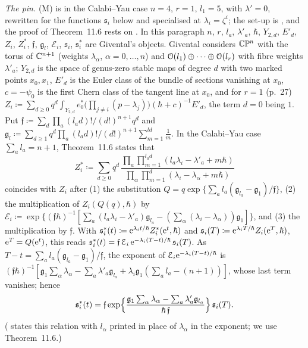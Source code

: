 \emph{The pin.} (M) is \cite[Theorem~11.6]{MR1408320} in the Calabi--Yau case $n=4$, $r=1$, $l_1=5$, with $\lambda'=0$, rewritten for the functions $\mathfrak s_i$ below and specialised at $\lambda_i=\zeta^i$; the set-up is \cite[Section~9, pp.~23--27]{MR1408320}, and the proof of Theorem~11.6 rests on \cite[Proposition~11.4]{MR1408320}. In this paragraph $n$, $r$, $l_a$, $\lambda'_a$, $\hbar$, $Y_{2,d}$, $E'_d$, $Z_i$, $Z_i^*$, $\mathfrak f$, $\mathfrak g_l$, $\mathcal E_i$, $\mathfrak s_i$, $\mathfrak s_i^*$ are Givental's objects. Givental considers $\mathbb{C}\mathbb{P}^n$ with the torus of $\mathbb{C}^{n+1}$ (weights $\lambda_\alpha$, $\alpha=0,\dots,n$) and $\mathcal{O}(l_1)\oplus\dots\oplus\mathcal{O}(l_r)$ with fibre weights $\lambda'_a$; $Y_{2,d}$ is the space of genus-zero stable maps of degree $d$ with two marked points $x_0,x_1$, $E'_d$ is the Euler class of the bundle of sections vanishing at $x_0$, $c=-\psi_0$ is the first Chern class of the tangent line at $x_0$, and for $r=1$ (p.~27) $Z_i\coloneqq\sum_{d\geq0}q^d\int_{Y_{2,d}}e_0^*\bigl(\prod_{j\neq i}(p-\lambda_j)\bigr)(\hbar+c)^{-1}E'_d$, the term $d=0$ being $1$. Put $\mathfrak f\coloneqq\sum_d\prod_a(l_ad)!/(d!)^{n+1}q^d$ and $\mathfrak g_l\coloneqq\sum_{d\geq1}q^d\prod_a(l_ad)!/(d!)^{n+1}\sum_{m=1}^{ld}\frac1m$. In the Calabi--Yau case $\sum_al_a=n+1$, Theorem~11.6 states that
\[
Z_i^*\coloneqq\sum_{d\geq0}q^d\,\frac{\prod_a\prod_{m=1}^{l_ad}(l_a\lambda_i-\lambda'_a+m\hbar)}{\prod_\alpha\prod_{m=1}^d(\lambda_i-\lambda_\alpha+m\hbar)}
\]
coincides with $Z_i$ after (1) the substitution $Q=q\exp\{\sum_al_a(\mathfrak g_{l_a}-\mathfrak g_1)/\mathfrak f\}$, (2) the multiplication of $Z_i(Q(q),\hbar)$ by $\mathcal E_i\coloneqq\exp\{(\mathfrak f\hbar)^{-1}[\sum_a(l_a\lambda_i-\lambda'_a)\mathfrak g_{l_a}-(\sum_\alpha(\lambda_i-\lambda_\alpha))\mathfrak g_1]\}$, and (3) the multiplication by $\mathfrak f$. With $\mathfrak s_i^*(t)\coloneqq\mathrm{e}^{\lambda_it/\hbar}Z_i^*(\mathrm{e}^t,\hbar)$ and $\mathfrak s_i(T)\coloneqq\mathrm{e}^{\lambda_iT/\hbar}Z_i(\mathrm{e}^T,\hbar)$, $\mathrm{e}^T=Q(\mathrm{e}^t)$, this reads $\mathfrak s_i^*(t)=\mathfrak f\,\mathcal E_i\,\mathrm{e}^{-\lambda_i(T-t)/\hbar}\,\mathfrak s_i(T)$. As $T-t=\sum_al_a(\mathfrak g_{l_a}-\mathfrak g_1)/\mathfrak f$, the exponent of $\mathcal E_i\mathrm{e}^{-\lambda_i(T-t)/\hbar}$ is $(\mathfrak f\hbar)^{-1}[\mathfrak g_1\sum_\alpha\lambda_\alpha-\sum_a\lambda'_a\mathfrak g_{l_a}+\lambda_i\mathfrak g_1(\sum_al_a-(n+1))]$, whose last term vanishes; hence
\[
\mathfrak s_i^*(t)=\mathfrak f\exp\Bigl\{\frac{\mathfrak g_1\sum_\alpha\lambda_\alpha-\sum_a\lambda'_a\mathfrak g_{l_a}}{\hbar\,\mathfrak f}\Bigr\}\,\mathfrak s_i(T).
\]
(\cite[Corollary~11.7]{MR1408320} states this relation with $l_\alpha$ printed in place of $\lambda_\alpha$ in the exponent; we use Theorem~11.6.)

